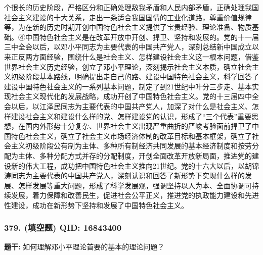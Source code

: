 \documentclass[12pt,UTF8]{ctexart}
\begin{document}
个很长的历史阶段，严格区分和正确处理敌我矛盾和人民内部矛盾，正确处理我国社会主义建设的十大关系，走出一条适合我国国情的工业化道路，尊重价值规律等，为在新的历史时期开创中国特色社会主义提供了宝贵经验、理论准备、物质基础。④中国特色社会主义是在改革开放中开创、捍卫、坚持和发展的。党的十一届三中全会以后，以邓小平同志为主要代表的中国共产党人，深刻总结新中国成立以来正反两方面经验，围绕什么是社会主义、怎样建设社会主义这一根本问题，借鉴世界社会主义历史经验，创立了邓小平理论，深刻揭示社会主义本质，确立社会主义初级阶段基本路线，明确提出走自己的路、建设中国特色社会主义，科学回答了建设中国特色社会主义的一系列基本问题，制定了到21世纪中叶分三步走、基本实现社会主义现代化的发展战略，成功开创了中国特色社会主义。党的十三届四中全会以后，以江泽民同志为主要代表的中国共产党人，加深了对什么是社会主义、怎样建设社会主义和建设什么样的党、怎样建设党的认识，形成了“三个代表”重要思想，在国内外形势十分复杂、世界社会主义出现严重曲折的严峻考验面前捍卫了中国特色社会主义，确立了社会主义市场经济体制的改革目标和基本框架，确立了社会主义初级阶段公有制为主体、多种所有制经济共同发展的基本经济制度和按劳分配为主体、多种分配方式并存的分配制度，开创全面改革开放新局面，推进党的建设新的伟大工程，成功把中国特色社会主义推向21世纪。党的十六大以后，以胡锦涛同志为主要代表的中国共产党人，深刻认识和回答了新形势下实现什么样的发展、怎样发展等重大问题，形成了科学发展观，强调坚持以人为本、全面协调可持续发展，着力保障和改善民生，促进社会公平正义，推进党的执政能力建设和先进性建设，成功在新形势下坚持和发展了中国特色社会主义。

\vspace{0.3em}\hrulefill\vspace{0.7em}

\subsubsection*{379. (填空题) \small QID: 16843400}

\textbf{题干:}
如何理解邓小平理论首要的基本的理论问题？
\end{document}
